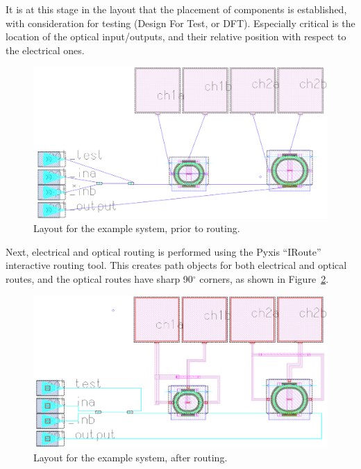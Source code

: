 \documentclass[journal]{spie}
\begin{document}
It is at this stage in the layout that the placement of components is established, with consideration for testing (Design For Test, or DFT).  Especially critical is the location of the optical input/outputs, and their relative position with respect to the electrical ones.  

\begin{figure}[tbp]
\centering
 \includegraphics[width=0.7\linewidth]{../figs/layout_wdm2tx_unrouted} 
\caption{Layout for the example system, prior to routing.}
\label{layout_wdm2tx_unrouted}
\end{figure}

Next, electrical and optical routing is performed using the Pyxis ``IRoute'' interactive routing tool.  This creates path objects for both electrical and optical routes, and the optical routes have sharp 90$^\circ$ corners, as shown in Figure~\ref{layout_wdm2tx_routed}.

\begin{figure}[tbp]
\centering
 \includegraphics[width=0.7\linewidth]{../figs/layout_wdm2tx_routed}
\caption{Layout for the example system, after routing.}
\label{layout_wdm2tx_routed}
\end{figure}
\end{document}
